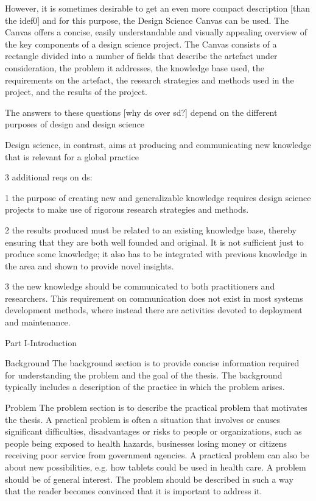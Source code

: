{%

However, it is sometimes desirable to get an
even more compact description [than the idef0] and for this purpose, the Design Science
Canvas can be used. The Canvas offers a concise, easily understandable
and visually appealing overview of the key components of
a design science project. The Canvas consists of a rectangle divided
into a number of fields that describe the artefact under consideration,
the problem it addresses, the knowledge base used, the requirements
on the artefact, the research strategies and methods
used in the project, and the results of the project.





The answers to these questions [why ds over sd?] depend on the different purposes of
design and design science

Design science, in contrast, aims at producing and
communicating new knowledge that is relevant for a global practice

3 additional reqs on ds:

1 the purpose of creating new and generalizable knowledge
requires design science projects to make use of rigorous research
strategies and methods.

2 the results produced must be related to an existing knowledge base,
thereby ensuring that they are both well founded and original. It is
not sufficient just to produce some knowledge; it also has to be integrated
with previous knowledge in the area and shown to provide
novel insights.

3 the new knowledge should be communicated to both
practitioners and researchers. This requirement on communication
does not exist in most systems development methods, where instead
there are activities devoted to deployment and maintenance.


Part I-Introduction

Background
The background section is to provide concise information required
for understanding the problem and the goal of the thesis. The background
typically includes a description of the practice in which the
problem arises.

Problem
The problem section is to describe the practical problem that motivates
the thesis. A practical problem is often a situation that involves
or causes significant difficulties, disadvantages or risks to people or
organizations, such as people being exposed to health hazards, businesses
losing money or citizens receiving poor service from government
agencies. A practical problem can also be about new possibilities,
e.g. how tablets could be used in health care. A problem should
be of general interest. The problem should be described in such a
way that the reader becomes convinced that it is important to address
it.

}
